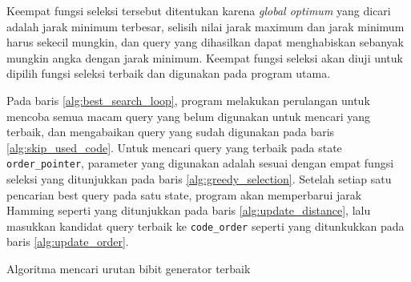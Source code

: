 Keempat fungsi seleksi tersebut ditentukan karena \textit{global optimum} yang dicari adalah jarak minimum terbesar, selisih nilai jarak maximum dan jarak minimum harus sekecil mungkin, dan query yang dihasilkan dapat menghabiskan sebanyak mungkin angka dengan jarak minimum. Keempat fungsi seleksi  akan diuji untuk dipilih fungsi seleksi terbaik dan digunakan pada program utama.

Pada baris \ref{alg:best_search_loop}, program melakukan perulangan untuk mencoba semua macam query yang belum digunakan untuk mencari yang terbaik, dan mengabaikan query yang sudah digunakan pada baris \ref{alg:skip_used_code}. Untuk mencari query yang terbaik pada state \texttt{order\_pointer}, parameter yang digunakan adalah sesuai dengan empat fungsi seleksi yang ditunjukkan pada baris \ref{alg:greedy_selection}. Setelah setiap satu pencarian best query pada satu state, program akan memperbarui jarak Hamming seperti yang ditunjukkan pada baris \ref{alg:update_distance}, lalu masukkan kandidat query terbaik ke \texttt{code\_order} seperti yang ditunkukkan pada baris \ref{alg:update_order}.

\begin{algorithm}[h]
\caption{Algoritma mencari urutan bibit generator terbaik}
\label{alg:exhaustive_search}
\end{algorithm}


